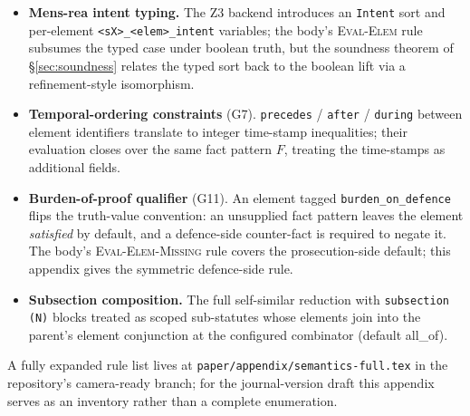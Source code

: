 \documentclass[10pt,a4paper,twocolumn]{article}
\begin{document}
\begin{itemize}
  \item \textbf{Mens-rea intent typing.} The Z3 backend
    introduces an \texttt{Intent} sort and per-element
    \texttt{<sX>\_<elem>\_intent} variables; the body's
    \textsc{Eval-Elem} rule subsumes the typed case under boolean
    truth, but the soundness theorem of
    \S\ref{sec:soundness} relates the typed sort back to the
    boolean lift via a refinement-style isomorphism.
  \item \textbf{Temporal-ordering constraints} (G7).
    \texttt{precedes} / \texttt{after} / \texttt{during} between
    element identifiers translate to integer time-stamp
    inequalities; their evaluation closes over the same fact
    pattern $F$, treating the time-stamps as additional fields.
  \item \textbf{Burden-of-proof qualifier} (G11). An element
    tagged \texttt{burden\_on\_defence} flips the truth-value
    convention: an unsupplied fact pattern leaves the element
    \emph{satisfied} by default, and a defence-side counter-fact
    is required to negate it. The body's
    \textsc{Eval-Elem-Missing} rule covers the prosecution-side
    default; this appendix gives the symmetric defence-side rule.
  \item \textbf{Subsection composition.} The full
    self-similar reduction with \texttt{subsection (N)} blocks
    treated as scoped sub-statutes whose elements join into the
    parent's element conjunction at the configured combinator
    (default \textsf{all\_of}).
\end{itemize}

A fully expanded rule list lives at
\texttt{paper/appendix/semantics-full.tex} in the repository's
camera-ready branch; for the journal-version draft this appendix
serves as an inventory rather than a complete enumeration.
\end{document}
